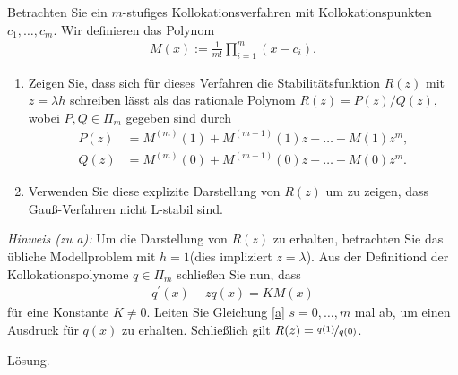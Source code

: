 \begin{exercise}
Betrachten Sie ein $m$-stufiges Kollokationsverfahren mit Kollokationspunkten
$c_1,\dots,c_m$. Wir definieren das Polynom
\begin{align*}
  M(x) := \frac{1}{m!}\prod_{i = 1}^m (x - c_i).
\end{align*}
\begin{enumerate}[label = \textbf{\alph*)}]
  \item Zeigen Sie, dass sich für dieses Verfahren die Stabilitätsfunktion $R(z)$
  mit $z = \lambda h$ schreiben lässt als das rationale Polynom $R(z) = P(z)/Q(z)$,
  wobei $P,Q \in \Pi_m$ gegeben sind durch
  \begin{align*}
    P(z) &= M^{(m)}(1) + M^{(m-1)}(1)z + \dots + M(1)z^m, \\
    Q(z) &= M^{(m)}(0) + M^{(m-1)}(0)z + \dots + M(0)z^m.
  \end{align*}
  \item Verwenden Sie diese explizite Darstellung von $R(z)$ um zu zeigen, dass
  Gauß-Verfahren nicht L-stabil sind.
\end{enumerate}
\textit{Hinweis (zu a):} Um die Darstellung von $R(z)$ zu erhalten, betrachten Sie
das übliche Modellproblem mit $h = 1$(dies impliziert $z = \lambda$). Aus der
Definitiond der Kollokationspolynome $q \in \Pi_m$ schließen Sie nun, dass
\begin{align*}\label{a}
  q^{\prime}(x) - zq(x) = KM(x)
\end{align*}
für eine Konstante $K \neq 0$. Leiten Sie Gleichung \eqref{a} $s=0,\dots,m$
mal ab, um einen Ausdruck für $q(x)$ zu erhalten. Schließlich gilt
$R(z) = \nicefrac{q(1)}{q(0)}$.
\end{exercise}
\begin{solution}
Lösung.
\end{solution}
